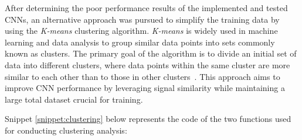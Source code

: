 \documentclass[12pt,english]{report}
\begin{document}
After determining the poor performance results of the implemented and tested CNNs, an alternative approach was pursued to simplify the training data by using the \textit{K-means} clustering algorithm. \textit{K-means} is widely used in machine learning and data analysis to group similar data points into sets commonly known as clusters. The primary goal of the algorithm is to divide an initial set of data into different clusters, where data points within the same cluster are more similar to each other than to those in other clusters~\cite{cluster}. This approach aims to improve CNN performance by leveraging signal similarity while maintaining a large total dataset crucial for training.

Snippet \ref{snippet:clustering} below represents the code of the two functions used for conducting clustering analysis:
\end{document}
